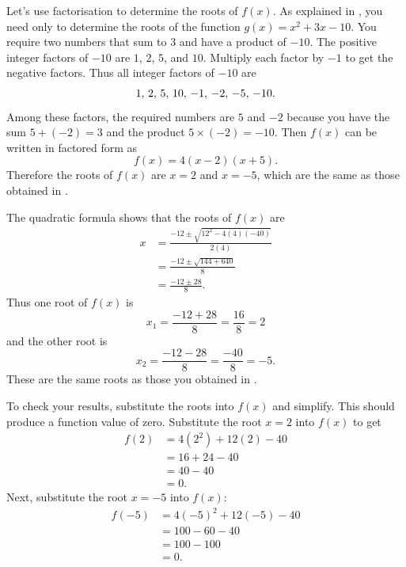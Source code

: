 \documentclass[a4paper,oneside,12pt]{article}
\begin{document}
{\begin{solution}
Let's use factorisation to determine the roots of $f(x)$.  As
explained
in , you
need only to determine the roots of the function
$g(x) = x^2 + 3x - 10$.  You require two numbers that sum to $3$ and
have a product of $-10$.  The positive integer factors of $-10$ are
$1$, $2$, $5$, and $10$.  Multiply each factor by $-1$ to get the
negative factors.  Thus all integer factors of $-10$ are
\[
{1},\, {2},\, {5},\, {10},\, {-1},\, {-2},\, {-5},\, {-10}.
\]
Among these factors, the required numbers are $5$ and $-2$ because you
have the sum $5 + (-2) = 3$ and the product $5 \times (-2) = -10$.
Then $f(x)$ can be written in factored form as
\[
f(x)
=
4(x - 2) (x + 5).
\]
Therefore the roots of $f(x)$ are $x = 2$ and $x = -5$, which are the
same as those obtained
in .

The quadratic formula shows that the roots of $f(x)$ are
\begin{align*}
x
&=
\frac{
  -12
  \pm
  \sqrt{
    12^2 - 4(4)(-40)
  }
}{
  2(4)
} \\[4pt]
&=
\frac{
  -12
  \pm
  \sqrt{144 + 640}
}{
  8
} \\[4pt]
&=
\frac{
  -12 \pm 28
}{
  8
}.
\end{align*}
Thus one root of $f(x)$ is
\[
x_1
=
\frac{-12 + 28}{8}
=
\frac{16}{8}
=
2
\]
and the other root is
\[
x_2
=
\frac{-12 - 28}{8}
=
\frac{-40}{8}
=
-5.
\]
These are the same roots as those you obtained
in .

To check your results, substitute the roots into $f(x)$ and simplify.
This should produce a function value of zero.  Substitute the root
$x = 2$ into $f(x)$ to get
\begin{align*}
f(2)
&=
4(2^2) + 12(2) - 40 \\[4pt]
&=
16 + 24 - 40 \\[4pt]
&=
40 - 40 \\[4pt]
&=
0.
\end{align*}
Next, substitute the root $x = -5$ into $f(x)$:
\begin{align*}
f(-5)
&=
4(-5)^2 + 12(-5) - 40 \\[4pt]
&=
100 - 60 - 40 \\[4pt]
&=
100 - 100 \\[4pt]
&=
0.
\end{align*}
\end{solution}
}{}
\end{document}
